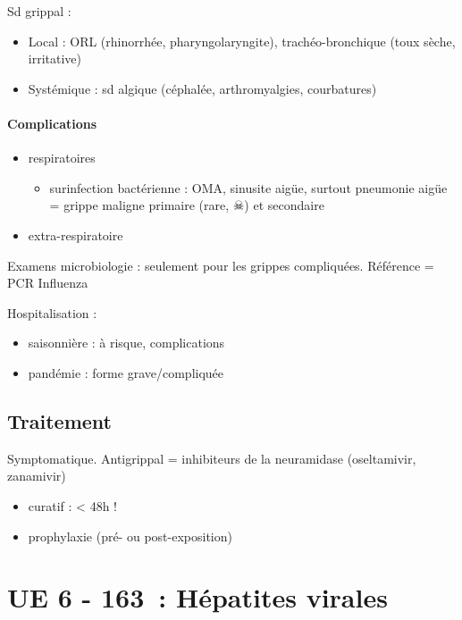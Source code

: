 Sd grippal :
\begin{itemize}
  \item 
    Local : ORL (rhinorrhée, pharyngolaryngite), trachéo-bronchique (toux sèche, irritative)
    \item Systémique : sd algique (céphalée, arthromyalgies, courbatures)
\end{itemize}

\paragraph{Complications}%
\label{par:complications}

\begin{itemize}
  \item respiratoires
    \begin{itemize}
      \item surinfection bactérienne : OMA, sinusite aigüe, surtout pneumonie aigüe =
        grippe maligne primaire (rare, $\skull$) et secondaire
    \end{itemize}
  \item extra-respiratoire
\end{itemize}

Examens microbiologie : seulement pour les grippes compliquées. Référence = PCR
Influenza

Hospitalisation : 
\begin{itemize}
  \item saisonnière : à risque, complications
  \item pandémie : forme grave/compliquée
\end{itemize}

\subsection{Traitement}%

Symptomatique.
Antigrippal = inhibiteurs de la neuramidase (oseltamivir, zanamivir)
\begin{itemize}
  \item curatif : < 48h !
  \item prophylaxie (pré- ou post-exposition)
\end{itemize}

\section{UE 6 - 163 : Hépatites virales}

